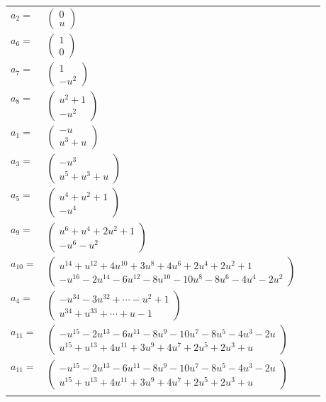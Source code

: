 \documentclass[1p]{elsarticle_modified}
\theoremstyle{definition}
\begin{document}
\begin{tabular}{m{7pt} m{180pt} m{7pt} m{180pt} }
\flushright $a_{2}=$&$\begin{pmatrix}0\\u\end{pmatrix}$ \\
\flushright $a_{6}=$&$\begin{pmatrix}1\\0\end{pmatrix}$ \\
\flushright $a_{7}=$&$\begin{pmatrix}1\\- u^2\end{pmatrix}$ \\
\flushright $a_{8}=$&$\begin{pmatrix}u^2+1\\- u^2\end{pmatrix}$ \\
\flushright $a_{1}=$&$\begin{pmatrix}- u\\u^3+u\end{pmatrix}$ \\
\flushright $a_{3}=$&$\begin{pmatrix}- u^3\\u^5+u^3+u\end{pmatrix}$ \\
\flushright $a_{5}=$&$\begin{pmatrix}u^4+u^2+1\\- u^4\end{pmatrix}$ \\
\flushright $a_{9}=$&$\begin{pmatrix}u^6+u^4+2 u^2+1\\- u^6- u^2\end{pmatrix}$ \\
\flushright $a_{10}=$&$\begin{pmatrix}u^{14}+u^{12}+4 u^{10}+3 u^8+4 u^6+2 u^4+2 u^2+1\\- u^{16}-2 u^{14}-6 u^{12}-8 u^{10}-10 u^8-8 u^6-4 u^4-2 u^2\end{pmatrix}$ \\
\flushright $a_{4}=$&$\begin{pmatrix}- u^{34}-3 u^{32}+\cdots- u^2+1\\u^{34}+u^{33}+\cdots+u-1\end{pmatrix}$ \\
\flushright $a_{11}=$&$\begin{pmatrix}- u^{15}-2 u^{13}-6 u^{11}-8 u^9-10 u^7-8 u^5-4 u^3-2 u\\u^{15}+u^{13}+4 u^{11}+3 u^9+4 u^7+2 u^5+2 u^3+u\end{pmatrix}$\\ \flushright $a_{11}=$&$\begin{pmatrix}- u^{15}-2 u^{13}-6 u^{11}-8 u^9-10 u^7-8 u^5-4 u^3-2 u\\u^{15}+u^{13}+4 u^{11}+3 u^9+4 u^7+2 u^5+2 u^3+u\end{pmatrix}$\\&\end{tabular}
\end{document}

